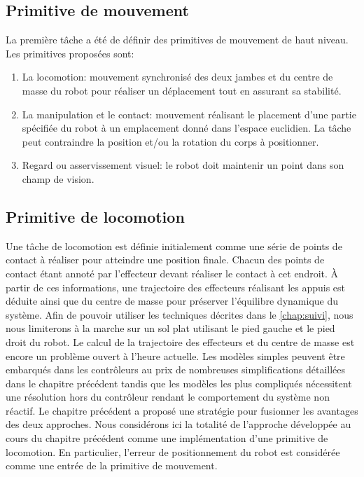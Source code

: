 \subsection{Primitive de mouvement}

La première tâche a été de définir des primitives de mouvement de
haut niveau. Les primitives proposées sont:
\begin{enumerate}
\item La locomotion: mouvement synchronisé des deux
  jambes et du centre de masse du robot pour réaliser un déplacement
  tout en assurant sa stabilité.
\item La manipulation et le contact: mouvement
  réalisant le placement d'une partie spécifiée du robot à un
  emplacement donné dans l'espace euclidien. La tâche peut contraindre
  la position et/ou la rotation du corps à positionner.
\item Regard ou asservissement visuel: le
  robot doit maintenir un point dans son champ de vision.
\end{enumerate}


\subsection{Primitive de locomotion}

Une tâche de locomotion est définie initialement comme une série de
points de contact à réaliser pour atteindre une position
finale. Chacun des points de contact étant
annoté par l'effecteur devant réaliser le contact à cet endroit. À
partir de ces informations, une trajectoire des effecteurs réalisant
les appuis est déduite ainsi que du centre de masse pour préserver
l'équilibre dynamique du système. Afin de pouvoir utiliser les
techniques décrites dans le \autoref{chap:suivi}, nous nous limiterons
à la marche sur un sol plat utilisant le pied gauche et le pied droit
du robot. Le calcul de la trajectoire des effecteurs et du centre de
masse est encore un problème ouvert à l'heure actuelle. Les modèles
simples peuvent être embarqués dans les contrôleurs au prix de
nombreuses simplifications détaillées dans le chapitre précédent
tandis que les modèles les plus compliqués nécessitent une résolution
hors du contrôleur rendant le comportement du système non réactif. Le
chapitre précédent a proposé une stratégie pour fusionner les
avantages des deux approches. Nous considérons ici la totalité de
l'approche développée au cours du chapitre précédent comme une
implémentation d'une primitive de locomotion. En particulier, l'erreur
de positionnement du robot est considérée comme une entrée de la
primitive de mouvement.


